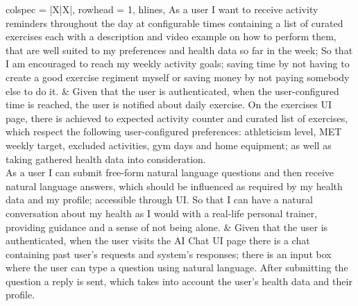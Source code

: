 \begin{center}
\begin{longtblr}[
            caption={User Stories},
            label={table:userStories}
        ] {
            colspec = {|X|X|},
            rowhead = 1,
            hlines,
        }
       As a user I want to receive activity reminders throughout the day at configurable times containing a list of curated exercises each with a description and video example on how to perform them, that are well suited to my preferences and health data so far in the week; So that I am encouraged to reach my weekly activity goals; saving time by not having to create a good exercise regiment myself or saving money by not paying somebody else to do it.  
       &
       Given that the user is authenticated, when the user-configured time is reached, the user is notified about daily exercise. On the exercises UI page, there is achieved to expected activity counter and curated list of exercises, which respect the following user-configured preferences: athleticism level, MET weekly target, excluded activities, gym days and home equipment; as well as taking gathered health data into consideration.
       \\
       As a user I can submit free-form natural language questions and then receive natural language answers, which should be influenced as required by my health data and my profile; accessible through UI. So that I can have a natural conversation about my health as I would with a real-life personal trainer, providing guidance and a sense of not being alone.
       &
       Given that the user is authenticated, when the user visits the AI Chat UI page there is a chat containing past user's requests and system's responses; there is an input box where the user can type a question using natural language. After submitting the question a reply is sent, which takes into account the user's health data and their profile.

        \end{longtblr}
    \end{center}

